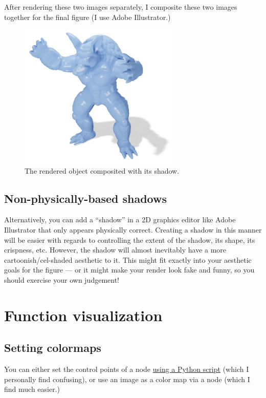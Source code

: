 \documentclass[10pt]{article}
\newcommand{\obj}[1]{\menu{\color{magenta} #1}}
\begin{document}
After rendering these two images separately, I composite these two images together for the final figure (I use Adobe Illustrator.)
\begin{figure}[H]
    \centering
    \captionsetup{width=0.8\textwidth}
    \includegraphics[width=3in]{images/final-render-with-shadow.png}
    \caption{The rendered object composited with its shadow.}
    \label{fig:final-render-with-shadow}
\end{figure}

\subsection{Non-physically-based shadows}
\label{sec:CartoonShadows}
Alternatively, you can add a ``shadow'' in a 2D graphics editor like Adobe Illustrator that only appears physically correct. Creating a shadow in this manner will be easier with regards to controlling the extent of the shadow, its shape, its crispness, etc. However, the shadow will almost inevitably have a more cartoonish/cel-shaded aesthetic to it. This might fit exactly into your aesthetic goals for the figure --- or it might make your render look fake and funny, so you should exercise your own judgement! %

\section{Function visualization}
\label{sec:FunctionVisualization}

\subsection{Setting colormaps}
You can either set the control points of a \obj{Color Ramp} node \href{https://blender.stackexchange.com/a/261366}{using a Python script} (which I personally find confusing), or use an image as a color map via a \obj{Image Texture} node (which I find much easier.) 
\end{document}
